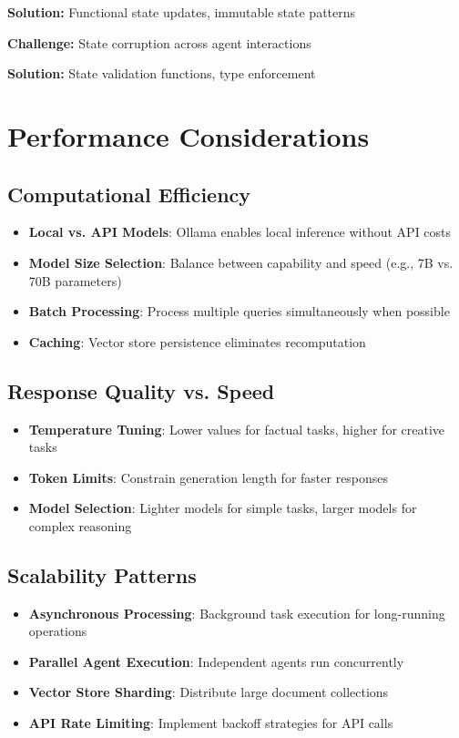 \documentclass[12pt,a4paper]{article}
\begin{document}
\textbf{Solution:} Functional state updates, immutable state patterns

\textbf{Challenge:} State corruption across agent interactions

\textbf{Solution:} State validation functions, type enforcement

\section{Performance Considerations}

\subsection{Computational Efficiency}

\begin{itemize}
    \item \textbf{Local vs. API Models}: Ollama enables local inference without API costs
    \item \textbf{Model Size Selection}: Balance between capability and speed (e.g., 7B vs. 70B parameters)
    \item \textbf{Batch Processing}: Process multiple queries simultaneously when possible
    \item \textbf{Caching}: Vector store persistence eliminates recomputation
\end{itemize}

\subsection{Response Quality vs. Speed}

\begin{itemize}
    \item \textbf{Temperature Tuning}: Lower values for factual tasks, higher for creative tasks
    \item \textbf{Token Limits}: Constrain generation length for faster responses
    \item \textbf{Model Selection}: Lighter models for simple tasks, larger models for complex reasoning
\end{itemize}

\subsection{Scalability Patterns}

\begin{itemize}
    \item \textbf{Asynchronous Processing}: Background task execution for long-running operations
    \item \textbf{Parallel Agent Execution}: Independent agents run concurrently
    \item \textbf{Vector Store Sharding}: Distribute large document collections
    \item \textbf{API Rate Limiting}: Implement backoff strategies for API calls
\end{itemize}
\end{document}
